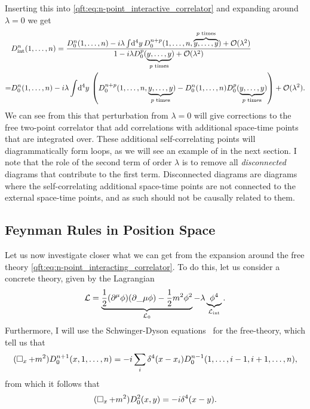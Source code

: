 \documentclass[../main.tex]{subfiles}
\begin{document}
Inserting this into \cref{qft:eq:n-point_interactive_correlator} and expanding around \(\lambda = 0\) we get
\begin{align}
  \label{qft:eq:n-point_interacting_correlator}
  \nonumber
    & D^n_\text{int}(1,\ldots, n) = \frac{D_0^n(1, \ldots, n) - i\lambda \int \!\mathrm{d}^4y\, D_0^{n+p}(1, \ldots, n, \overbrace{y, \ldots, y}^{p\text{ times}}) + \mathcal{O}(\lambda^2)}{1 - i\lambda D_0^p(\underbrace{y, \ldots, y}_{p\text{ times}}) + \mathcal{O}(\lambda^2)} \\
  = & D^n_0(1,\ldots,n) - i\lambda \int \!\mathrm{d}^4y\, \left(D_0^{n+p}(1, \ldots, n, \underbrace{y, \ldots, y}_{p\text{ times}}) - D_0^n(1, \ldots, n) D_0^p(\underbrace{y, \ldots, y}_{p\text{ times}})\right) + \mathcal{O}(\lambda^2).
\end{align}
We can see from this that perturbation from \(\lambda = 0\) will give corrections to the free two-point correlator that add correlations with additional space-time points that are integrated over.
These additional self-correlating points will diagrammatically form loops, as we will see an example of in the next section.
I note that the role of the second term of order \(\lambda\) is to remove all \emph{disconnected} diagrams that contribute to the first term.
Disconnected diagrams are diagrams where the self-correlating additional space-time points are not connected to the external space-time points, and as such should not be causally related to them.


\subsection{Feynman Rules in Position Space}
Let us now investigate closer what we can get from the expansion around the free theory \cref{qft:eq:n-point_interacting_correlator}.
To do this, let us consider a concrete theory, given by the Lagrangian
\begin{equation}
  \L = \underbrace{\frac{1}{2}(\partial\^\mu \phi)(\partial\_\mu\phi) - \frac{1}{2}m^2 \phi^2}_{\L_0} - \lambda \underbrace{\phi^4}_{\L_\text{int}}.
\end{equation}
Furthermore, I will use the Schwinger-Dyson equations~\cite{Schwartz:2014sze} for the free-theory, which tell us that
\begin{equation}
  \label{qft:eq:Schwinger-Dyson_n-point}
  (\operatorname{\Box}_x + m^2) D_0^{n+1}(x, 1, \ldots, n) = -i\sum_{i} \delta^4(x-x_i) D_0^{n-1}(1, \ldots, i-1, i+1, \ldots, n),
\end{equation}
from which it follows that
\begin{equation}
  \label{qft:eq:Schwinger-Dyson_2-point}
  (\operatorname{\Box}_x + m^2) D^2_0(x,y) = -i \delta^4(x-y).
\end{equation}
\end{document}

